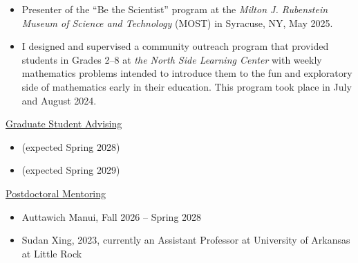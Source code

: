 \documentclass[12pt]{article}
\theoremstyle{plain} \numberwithin{equation}{section}
\theoremstyle{definition}
\newcommand{\cvsection}[1]{%
  \Needspace{6\baselineskip}%
  \par\addvspace{0.8\baselineskip}%
  \noindent\underline{#1}\par\nobreak
  \vspace{0.3\baselineskip}%
}
\begin{document}
\begin{itemize}
	This mini-course was well-received by the teachers based on a survey conducted after the course.

\item Presenter of the ``Be the Scientist'' program at the \emph{Milton J. Rubenstein Museum of Science and Technology} (MOST) in Syracuse, NY, May 2025.

\item I designed and supervised a community outreach program that provided students in Grades 2--8 at \emph{the North Side Learning Center} with weekly mathematics problems intended to introduce them to the fun and exploratory side of mathematics early in their education. This program took place in July and August 2024.
\end{itemize}

\cvsection{Graduate Student Advising}
\begin{itemize}
	\item {}(expected Spring 2028)
	\item {}(expected Spring 2029)
\end{itemize}


\cvsection{Postdoctoral Mentoring}
\begin{itemize}
	\item Auttawich Manui, Fall 2026 -- Spring 2028
	\item Sudan Xing, 2023, currently an Assistant Professor at University of Arkansas at Little Rock
\end{itemize}
\end{document}
